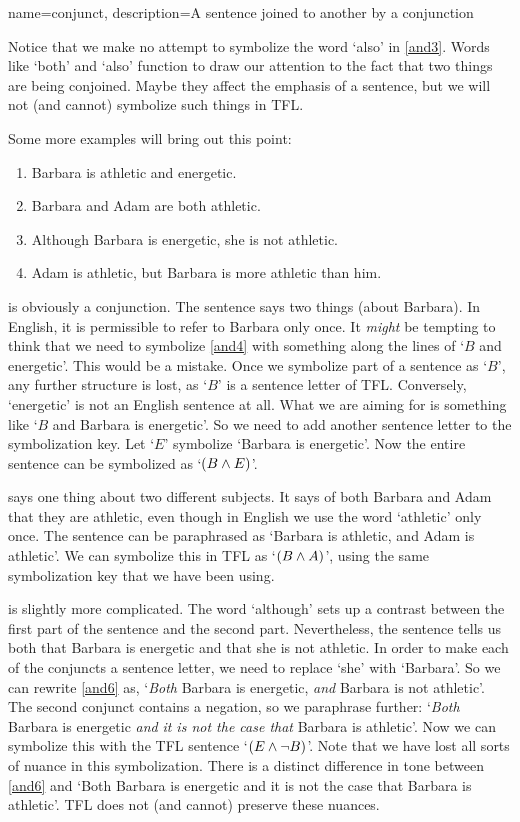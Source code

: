 {
name=conjunct,
description={A sentence joined to another by a \gls{conjunction}}
}


Notice that we make no attempt to symbolize the word `also' in \cref*{and3}. Words like `both' and `also' function to draw our attention to the fact that two things are being conjoined. Maybe they affect the emphasis of a sentence, but we will not (and cannot) symbolize such things in TFL.

Some more examples will bring out this point:
	\begin{enumerate}
		\item\label{and4}Barbara is athletic and energetic.
		\item\label{and5}Barbara and Adam are both athletic.
		\item\label{and6}Although Barbara is energetic, she is not athletic.
	\item\label{and7}Adam is athletic, but Barbara is more athletic than him.
	\end{enumerate}
 is obviously a conjunction. The sentence says two things (about Barbara). In English, it is permissible to refer to Barbara only once. It \emph{might} be tempting to think that we need to symbolize \cref*{and4} with something along the lines of `$B$ and energetic'. This would be a mistake. Once we symbolize part of a sentence as `$B$', any further structure is lost, as `$B$' is a sentence letter of TFL. Conversely, `energetic' is not an English sentence at all. What we are aiming for is something like `$B$ and Barbara is energetic'. So we need to add another sentence letter to the symbolization key. Let `$E$' symbolize `Barbara is energetic'. Now the entire sentence can be symbolized as `$(B\wedge E)$'.

 says one thing about two different subjects. It says of both Barbara and Adam that they are athletic, even though in English we use the word `athletic' only once. The sentence can be paraphrased as `Barbara is athletic, and Adam is athletic'. We can symbolize this in TFL as `$(B\wedge A)$', using the same symbolization key that we have been using.

 is slightly more complicated. The word `although' sets up a contrast between the first part of the sentence and the second part. Nevertheless, the sentence tells us both that Barbara is energetic and that she is not athletic. In order to make each of the conjuncts a sentence letter, we need to replace `she' with `Barbara'. So we can rewrite \cref*{and6} as, `\emph{Both} Barbara is energetic, \emph{and} Barbara is not athletic'. The second conjunct contains a negation, so we paraphrase further: `\emph{Both} Barbara is energetic \emph{and} \emph{it is not the case that} Barbara is athletic'. Now we can symbolize this with the TFL sentence `$(E\wedge\neg B)$'. Note that we have lost all sorts of nuance in this symbolization. There is a distinct difference in tone between \cref*{and6} and `Both Barbara is energetic and it is not the case that Barbara is athletic'. TFL does not (and cannot) preserve these nuances.

